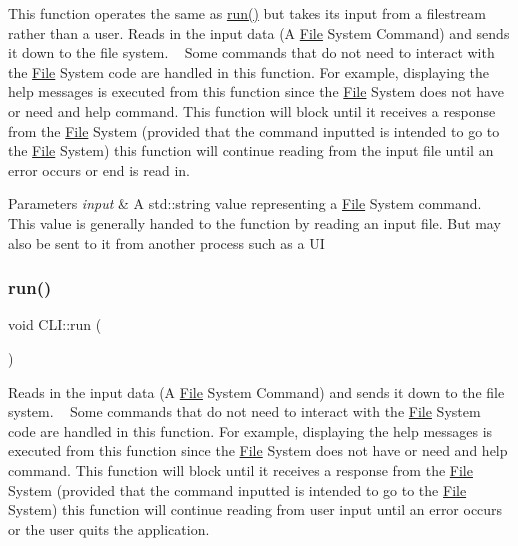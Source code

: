 This function operates the same as \mbox{\hyperlink{classCLI_aeefc8cd81999836a90c2cfaced6177f1}{run()}} but takes its input from a filestream rather than a user. Reads in the input data (A \mbox{\hyperlink{classFile}{File}} System Command) and sends it down to the file system. ~\newline
Some commands that do not need to interact with the \mbox{\hyperlink{classFile}{File}} System code are handled in this function. For example, displaying the \textquotesingle{}help\textquotesingle{} messages is executed from this function since the \mbox{\hyperlink{classFile}{File}} System does not have or need and \textquotesingle{}help\textquotesingle{} command. This function will block until it receives a response from the \mbox{\hyperlink{classFile}{File}} System (provided that the command inputted is intended to go to the \mbox{\hyperlink{classFile}{File}} System) this function will continue reading from the input file until an error occurs or \textquotesingle{}end\textquotesingle{} is read in.


\begin{DoxyParams}{Parameters}
{\em input} & A std\+::string value representing a \mbox{\hyperlink{classFile}{File}} System command. This value is generally handed to the function by reading an input file. But may also be sent to it from another process such as a UI \\
\hline
\end{DoxyParams}
\mbox{\label{classCLI_aeefc8cd81999836a90c2cfaced6177f1}} 
\subsubsection{\texorpdfstring{run()}{run()}\hspace{0.1cm}{\footnotesize\ttfamily [2/2]}}
{\footnotesize\ttfamily void C\+L\+I\+::run (\begin{DoxyParamCaption}{ }\end{DoxyParamCaption})}

Reads in the input data (A \mbox{\hyperlink{classFile}{File}} System Command) and sends it down to the file system. ~\newline
Some commands that do not need to interact with the \mbox{\hyperlink{classFile}{File}} System code are handled in this function. For example, displaying the \textquotesingle{}help\textquotesingle{} messages is executed from this function since the \mbox{\hyperlink{classFile}{File}} System does not have or need and \textquotesingle{}help\textquotesingle{} command. This function will block until it receives a response from the \mbox{\hyperlink{classFile}{File}} System (provided that the command inputted is intended to go to the \mbox{\hyperlink{classFile}{File}} System) this function will continue reading from user input until an error occurs or the user quits the application.


